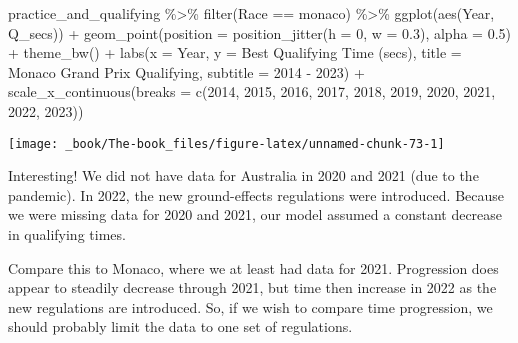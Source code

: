 \documentclass[
]{book}
\newenvironment{Shaded}{\begin{snugshade}}{\end{snugshade}}
\newcommand{\AttributeTok}[1]{\textcolor[rgb]{0.77,0.63,0.00}{#1}}
\newcommand{\DecValTok}[1]{\textcolor[rgb]{0.00,0.00,0.81}{#1}}
\newcommand{\FloatTok}[1]{\textcolor[rgb]{0.00,0.00,0.81}{#1}}
\newcommand{\FunctionTok}[1]{\textcolor[rgb]{0.00,0.00,0.00}{#1}}
\newcommand{\NormalTok}[1]{#1}
\newcommand{\SpecialCharTok}[1]{\textcolor[rgb]{0.00,0.00,0.00}{#1}}
\newcommand{\StringTok}[1]{\textcolor[rgb]{0.31,0.60,0.02}{#1}}
\begin{document}
\begin{Shaded}
\begin{Highlighting}[]
\NormalTok{practice\_and\_qualifying }\SpecialCharTok{\%\textgreater{}\%}
  \FunctionTok{filter}\NormalTok{(Race }\SpecialCharTok{==} \StringTok{\textquotesingle{}monaco\textquotesingle{}}\NormalTok{) }\SpecialCharTok{\%\textgreater{}\%}
  \FunctionTok{ggplot}\NormalTok{(}\FunctionTok{aes}\NormalTok{(Year, Q\_secs)) }\SpecialCharTok{+}
  \FunctionTok{geom\_point}\NormalTok{(}\AttributeTok{position =} \FunctionTok{position\_jitter}\NormalTok{(}\AttributeTok{h =} \DecValTok{0}\NormalTok{, }\AttributeTok{w =} \FloatTok{0.3}\NormalTok{), }\AttributeTok{alpha =} \FloatTok{0.5}\NormalTok{) }\SpecialCharTok{+}
  \FunctionTok{theme\_bw}\NormalTok{() }\SpecialCharTok{+}
  \FunctionTok{labs}\NormalTok{(}\AttributeTok{x =} \StringTok{\textquotesingle{}Year\textquotesingle{}}\NormalTok{,}
       \AttributeTok{y =} \StringTok{\textquotesingle{}Best Qualifying Time (secs)\textquotesingle{}}\NormalTok{,}
       \AttributeTok{title =} \StringTok{\textquotesingle{}Monaco Grand Prix Qualifying\textquotesingle{}}\NormalTok{,}
       \AttributeTok{subtitle =} \StringTok{\textquotesingle{}2014 {-} 2023\textquotesingle{}}\NormalTok{) }\SpecialCharTok{+}
  \FunctionTok{scale\_x\_continuous}\NormalTok{(}\AttributeTok{breaks =} \FunctionTok{c}\NormalTok{(}\DecValTok{2014}\NormalTok{, }\DecValTok{2015}\NormalTok{, }\DecValTok{2016}\NormalTok{, }\DecValTok{2017}\NormalTok{, }\DecValTok{2018}\NormalTok{, }\DecValTok{2019}\NormalTok{, }\DecValTok{2020}\NormalTok{, }\DecValTok{2021}\NormalTok{, }\DecValTok{2022}\NormalTok{, }\DecValTok{2023}\NormalTok{))}
\end{Highlighting}
\end{Shaded}

\begin{center}\texttt{[image: \_book/The-book\_files/figure-latex/unnamed-chunk-73-1]} \end{center}

Interesting! We did not have data for Australia in 2020 and 2021 (due to the pandemic). In 2022, the new ground-effects regulations were introduced. Because we were missing data for 2020 and 2021, our model assumed a constant decrease in qualifying times.

Compare this to Monaco, where we at least had data for 2021. Progression does appear to steadily decrease through 2021, but time then increase in 2022 as the new regulations are introduced. So, if we wish to compare time progression, we should probably limit the data to one set of regulations.
\end{document}
